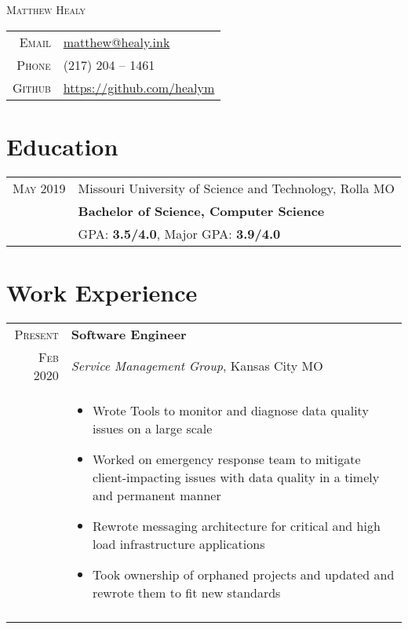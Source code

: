 \documentclass[a4paper,10pt]{article}
\newcommand{\br}{\\\multicolumn{2}{c}{}}
\begin{document}
\pagestyle{empty}

\par{\centering
    {\Huge \textsc{Matthew Healy}
}\bigskip\par}

\begin{center}
\begin{tabular}{rl}
    \textsc{Email } & \href{mailto:matthew@healy.ink}{matthew@healy.ink} \\
    \textsc{Phone }        & (217) 204 -- 1461  \\
    \textsc{Github }       & \url{https://github.com/healym} \\
\end{tabular}
\end{center}

\section{Education}
\begin{tabular}{r|p{15cm}}
    \textsc{May} 2019 & Missouri University of Science and Technology, Rolla MO  \\
                      & \textbf{Bachelor of Science, Computer Science} \\
                      & GPA: \textbf{3.5/4.0}, Major GPA: \textbf{3.9/4.0} \\
\end{tabular}


\section{Work Experience}

\begin{tabular}{r|p{15cm}}
    \textsc{Present} & \textbf{Software Engineer} \\
    \textsc{Feb 2020}  & \textit{Service Management Group}, Kansas City MO \\ &
    \begin{itemize}
    \item Wrote Tools to monitor and diagnose data quality issues on a large scale
    \item Worked on emergency response team to mitigate client-impacting issues with data quality in a timely and permanent manner
    \item Rewrote messaging architecture for critical and high load infrastructure applications
    \item Took ownership of orphaned projects and updated and rewrote them to fit new standards

    \end{itemize} \br\\

\end{tabular}
\end{document}
